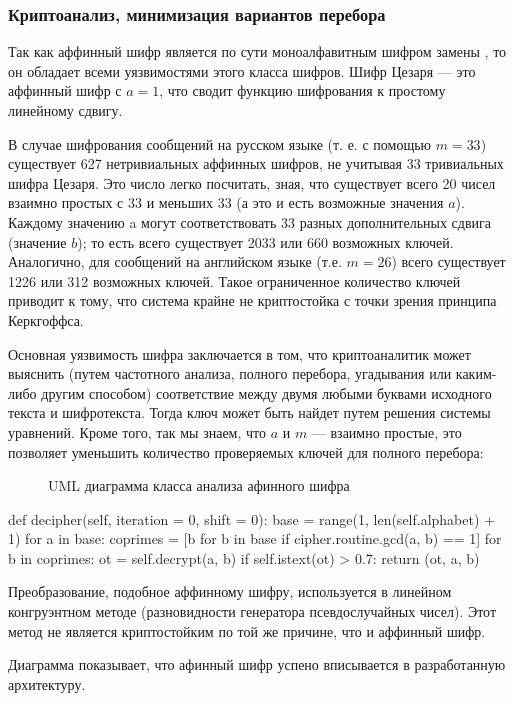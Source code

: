 \subsubsection{Криптоанализ, минимизация вариантов перебора}

Так как аффинный шифр является по сути моноалфавитным шифром замены
, то он обладает всеми уязвимостями этого класса шифров. Шифр Цезаря —
это аффинный шифр с $a = 1$, что сводит функцию шифрования к простому 
линейному сдвигу.

В случае шифрования сообщений на русском языке (т. е. с помощью $m = 33$) 
существует 627 нетривиальных аффинных шифров, не учитывая 33 тривиальных шифра 
Цезаря. Это число легко посчитать, зная, что существует всего 20 чисел 
взаимно простых с 33 и меньших 33 (а это и есть возможные значения 
$a$). Каждому значению a могут соответствовать 33 разных дополнительных 
сдвига (значение $b$); то есть всего существует 2033 или 660 возможных 
ключей. Аналогично, для сообщений на английском языке (т.е. $m = 26$) 
всего существует 1226 или 312 возможных ключей. Такое ограниченное 
количество ключей приводит к тому, что система крайне не криптостойка 
с точки зрения принципа Керкгоффса.

Основная уязвимость шифра заключается в том, что криптоаналитик может 
выяснить (путем частотного анализа, полного перебора, угадывания или 
каким-либо другим способом) соответствие между двумя любыми буквами 
исходного текста и шифротекста. Тогда ключ может быть найдет путем 
решения системы уравнений. Кроме того, так мы знаем, что $a$ и $m$ — взаимно 
простые, это позволяет уменьшить количество проверяемых ключей для 
полного перебора:

\begin{figure}[bh]
\noindent{}
\caption{UML диаграмма класса анализа афинного шифра}
\label{figCurves}
\end{figure}

\begin{listing}[1]{1}
def decipher(self, iteration = 0, shift = 0):
    base = range(1, len(self.alphabet) + 1)
    for a in base:
        coprimes = [b for b in base if cipher.routine.gcd(a, b) == 1]
        for b in coprimes:
            ot = self.decrypt(a, b)
            if self.istext(ot) > 0.7:
                return (ot, a, b)
\end{listing}

Преобразование, подобное аффинному шифру, используется в линейном 
конгруэнтном методе (разновидности генератора псевдослучайных чисел).
Этот метод не является криптостойким по той же причине, что и аффинный 
шифр.

Диаграмма показывает, что афинный шифр успено вписывается 
в разработанную архитектуру.
